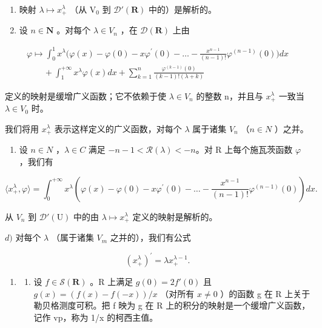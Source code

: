 \begin{enumerate}
\def\labelenumi{\alph{enumi})}
\item
  映射 \(\lambda \mapsto x_{+}^{\lambda}\) （从 \(\mathrm{V}_0\) 到 \(\mathcal{D}'(\mathbf{R})\) 中的）是解析的。
\item
  设 \(n \in \mathbf{N}\) 。对每个 \(\lambda \in V_n\) ，在 \(\mathcal{D}(\mathbf{R})\) 上由
\end{enumerate}

\[
\begin{array}{l} \varphi \mapsto \int_ {0} ^ {1} x ^ {\lambda} \Big (\varphi (x) - \varphi (0) - x \varphi^ {\prime} (0) - \dots - \frac {x ^ {n - 1}}{(n - 1) !} \varphi^ {(n - 1)} (0) \Big) d x \\ \qquad + \int_ {1} ^ {+ \infty} x ^ {\lambda} \varphi (x) d x + \sum_ {k = 1} ^ {n} \frac {\varphi^ {(k - 1)} (0)}{(k - 1) ! (\lambda + k)} \end{array}
\]

定义的映射是缓增广义函数；它不依赖于使 \(\lambda \in V_{n}\) 的整数 n，并且与 \(x_{+}^{\lambda}\) 一致当 \(\lambda \in V_{0}\) 时。

我们将用 \(x_{+}^{\lambda}\) 表示这样定义的广义函数，对每个 \(\lambda\) 属于诸集 \(V_{n}\) （\(n \in N\) ）之并。

\begin{enumerate}
\def\labelenumi{\alph{enumi})}
\setcounter{enumi}{2}
\tightlist
\item
  设 \(n \in N\) ，\(\lambda \in C\) 满足 \(-n - 1 < \mathcal{R}(\lambda) < -n\)。对 R 上每个施瓦茨函数 \(\varphi\) ，我们有
\end{enumerate}

\[
\langle x _ {+} ^ {\lambda}, \varphi \rangle = \int_ {0} ^ {+ \infty} x ^ {\lambda} \left(\varphi (x) - \varphi (0) - x \varphi^ {\prime} (0) - \dots - \frac {x ^ {n - 1}}{(n - 1) !} \varphi^ {(n - 1)} (0)\right) d x.
\]

  从 \(V_{n}\) 到 \(\mathcal{D}'(\mathrm{U})\) 中的由 \(\lambda\mapsto x_{+}^{\lambda}\) 定义的映射是解析的。

\(d)\) 对每个 \(\lambda\) （属于诸集 \(V_{m}\) 之并的），我们有公式

\[
(x _ {+} ^ {\lambda}) ^ {\prime} = \lambda x _ {+} ^ {\lambda - 1}.
\]

\begin{enumerate}
\def\labelenumi{\arabic{enumi})}
\setcounter{enumi}{20}
\tightlist
\item
  \begin{enumerate}
  \def\labelenumii{\alph{enumii})}
  \tightlist
  \item
    设 \(f \in \mathcal{S}(\mathbf{R})\) 。R 上满足 \(g(0) = 2f'(0)\) 且 \(g(x) = (f(x) - f(-x))/x\) （对所有 \(x \neq 0\) ）的函数 g 在 R 上关于勒贝格测度可积。把 f 映为 g 在 R 上的积分的映射是一个缓增广义函数，记作 vp，称为 1/x 的柯西主值。
  \end{enumerate}
\end{enumerate}

